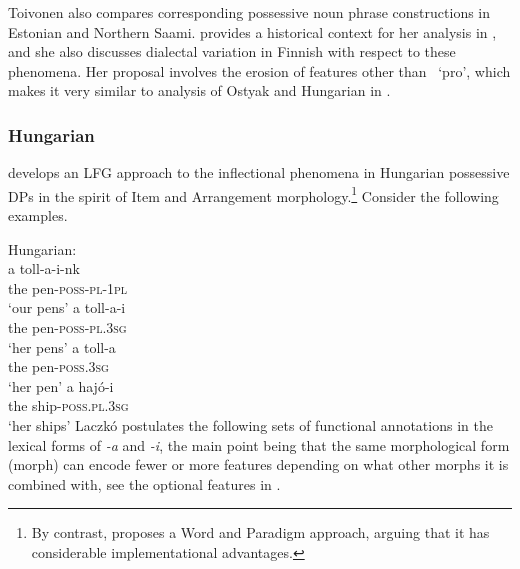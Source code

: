 \documentclass[output=paper,hidelinks]{langscibook}
\begin{document}
\ea%
    \label{ex:FinnoUgric:95}
 
\z


\ea%
    \label{ex:FinnoUgric:96}
     
\z

Toivonen also compares corresponding possessive noun phrase constructions in Estonian and Northern Saami. \citet{Toivonen2001b} provides a historical context for her analysis in \citet{Toivonen:FinnPoss}, and she also discusses dialectal variation in Finnish with respect to these phenomena. Her proposal involves the erosion of features other than \PRED\ `pro', which makes it very similar to  analysis of Ostyak and Hungarian in .

\subsubsection{Hungarian}
\label{sec:FinnoUgric:8.3.2}

\citet{Laczko2001} develops an LFG approach to the inflectional phenomena in Hungarian possessive DPs in the spirit of Item and Arrangement morphology.\footnote{By contrast, \citet{Laczko2018} proposes a Word and Paradigm approach, arguing that it has considerable implementational advantages.} Consider the following examples.

\ea%
    \label{ex:FinnoUgric:97}Hungarian:\\
\ea\label{ex:FinnoUgric:97a}
    \gll a toll-a-i-nk\\
        the pen-\textsc{poss-pl-1pl}\\
    \glt`our pens'
\ex\label{ex:FinnoUgric:97b}
    \gll a toll-a-i\\
        the pen-\textsc{poss-pl.3sg}\\
    \glt`her pens'
\ex\label{ex:FinnoUgric:97c}
    \gll a toll-a\\
      the pen-\textsc{poss.3sg}\\
    \glt`her pen'
\ex\label{ex:FinnoUgric:97d}
    \gll a hajó-i\\
       the ship-\textsc{poss.pl.3sg}\\
    \glt`her ships'
\z\z
Laczkó postulates the following sets of functional annotations in the
lexical forms of \textit{{}-a} and \textit{{}-i}, the main point being
that the same morphological form (morph) can encode fewer or more
features depending on what other morphs it is combined with, see the
optional features in .
\end{document}
